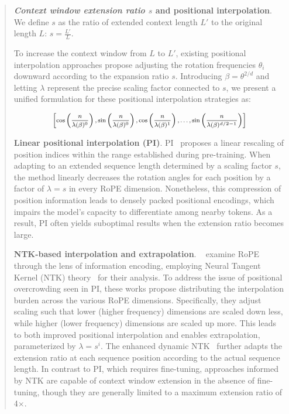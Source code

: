 \begin{abstract}
\textbf{\emph{Context window extension ratio $s$} and positional interpolation}. We define $s$ as  the ratio of extended context length $L'$ to the original length $L$: $s=\frac{L'}{L}$. 

To increase the context window from $L$ to $L'$, existing positional interpolation approaches propose adjusting the rotation frequencies $\theta_i$ downward according to the expansion ratio $s$. Introducing $\beta=\theta^{2/d}$ and letting $\lambda$ represent the precise scaling factor connected to $s$, we present a unified formulation for these positional interpolation strategies as:

\begin{equation}	
	\fontsize{7.5}{7.5} \selectfont
	\label{eq:unified_rope}
	\begin{aligned}
		\left[\cos\left(\frac{n}{\lambda(\beta)^0}\right), \sin \left(\frac{n}{\lambda(\beta)^0}\right), \cos\left(\frac{n}{\lambda(\beta)^1}\right), \ldots,  \sin \left(\frac{n}{\lambda(\beta)^{d/2-1}}\right) \right]   
	\end{aligned}
\end{equation}

\textbf{Linear positional interpolation (PI)}. PI~\cite{pi} proposes a linear rescaling of position indices within the range established during pre-training. When adapting to an extended sequence length determined by a scaling factor $s$, the method linearly decreases the rotation angles for each position by a factor of $\lambda=s$ in every RoPE dimension. Nonetheless, this compression of position information leads to densely packed positional encodings, which impairs the model's capacity to differentiate among nearby tokens. As a result, PI often yields suboptimal results when the extension ratio becomes large.

\textbf{NTK-based interpolation and extrapolation}. ~\cite{ntk,dynamicntk} examine RoPE through the lens of information encoding, employing Neural Tangent Kernel (NTK) theory~\cite{jacot2018neural,tancik2020fourier} for their analysis. To address the issue of positional overcrowding seen in PI, these works propose distributing the interpolation burden across the various RoPE dimensions. Specifically, they adjust scaling such that lower (higher frequency) dimensions are scaled down less, while higher (lower frequency) dimensions are scaled up more. This leads to both improved positional interpolation and enables extrapolation, parameterized by $\lambda=s^{i}$. The enhanced dynamic NTK~\cite{dynamicntk} further adapts the extension ratio at each sequence position according to the actual sequence length. In contrast to PI, which requires fine-tuning, approaches informed by NTK are capable of context window extension in the absence of fine-tuning, though they are generally limited to a maximum extension ratio of 4$\times$.


\end{abstract}
